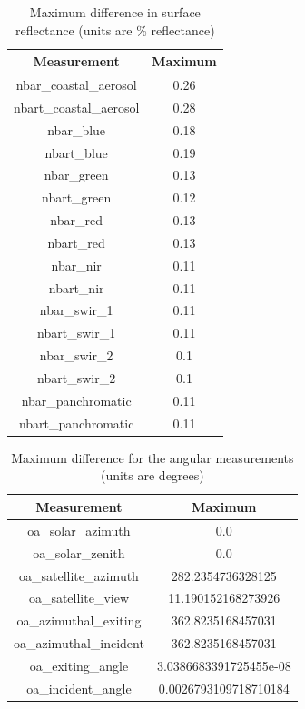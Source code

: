 \documentclass[a4paper]{article}
\begin{document}
    \begin{table}[ht!]
      \caption{Maximum difference in surface reflectance (units are \% reflectance)}\label{table:2}
      \centering
      \begin{tabular}{cc} \midrule
        \textbf{Measurement} & \textbf{Maximum} \\ \midrule
        nbar\_coastal\_aerosol & 0.26 \\
        nbart\_coastal\_aerosol & 0.28 \\
        nbar\_blue & 0.18 \\
        nbart\_blue & 0.19 \\
        nbar\_green & 0.13 \\
        nbart\_green & 0.12 \\
        nbar\_red & 0.13 \\
        nbart\_red & 0.13 \\
        nbar\_nir & 0.11 \\
        nbart\_nir & 0.11 \\
        nbar\_swir\_1 & 0.11 \\
        nbart\_swir\_1 & 0.11 \\
        nbar\_swir\_2 & 0.1 \\
        nbart\_swir\_2 & 0.1 \\
        nbar\_panchromatic & 0.11 \\
        nbart\_panchromatic & 0.11 \\ \midrule
      \end{tabular}
    \end{table}

  \newpage

    \begin{table}[ht!]
      \caption{Maximum difference for the angular measurements (units are degrees)}\label{table:3}
      \centering
      \begin{tabular}{cc} \midrule
        \textbf{Measurement} & \textbf{Maximum} \\ \midrule
        oa\_solar\_azimuth & 0.0 \\
        oa\_solar\_zenith & 0.0 \\
        oa\_satellite\_azimuth & 282.2354736328125 \\
        oa\_satellite\_view & 11.190152168273926 \\
        oa\_azimuthal\_exiting & 362.8235168457031 \\
        oa\_azimuthal\_incident & 362.8235168457031 \\
        oa\_exiting\_angle & 3.0386683391725455e-08 \\
        oa\_incident\_angle & 0.0026793109718710184 \\ \midrule
      \end{tabular}
    \end{table}
\end{document}
